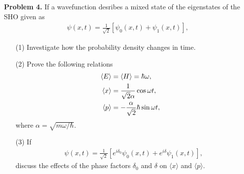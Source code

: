 \documentclass[floatfix,nofootinbib,superscriptaddress,fleqn]{revtex4-2}
\begin{document}
\vspace{1cm}

\noindent \textbf{Problem 4.}
If a wavefunction desribes a mixed state of the eigenstates of the SHO
given as 
\begin{align}
  \psi(x,t) = \frac1{\sqrt{2}}[\psi_0(x,t) + \psi_1(x,t)] ,
\end{align}
\begin{itemize}
\item[(1)] Investigate how the probability density changes in time. 
\item[(2)] Prove the following relations 
  \begin{align}
\langle E\rangle &= \langle H\rangle =\hbar \omega    ,\cr
\langle x \rangle &= \frac1{\sqrt{2}\alpha}\cos\omega t,\cr
\langle p \rangle &= -\frac{\alpha}{\sqrt{2}}\hbar \sin\omega t,
 \end{align}
where $\alpha = \sqrt{m\omega/\hbar}$.
 \item[(3)] If 
   \begin{align}
 \psi(x,t) = \frac1{\sqrt{2}}[e^{i\delta_0} \psi_0(x,t) + e^{i\delta}
     \psi_1(x,t)],     
   \end{align}
discuss the effects of the phase factors $\delta_0$ and $\delta$ on
$\langle x\rangle$ and $\langle p\rangle$.
\end{itemize}
\end{document}
